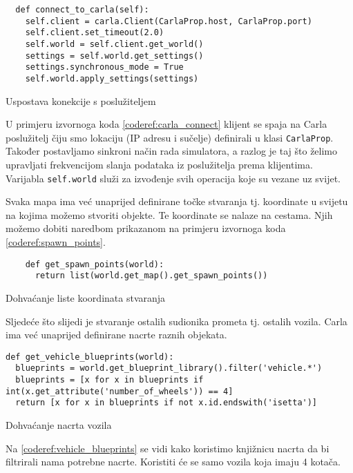 \begin{listing}[h!]
  \begin{verbatim}
  def connect_to_carla(self):
    self.client = carla.Client(CarlaProp.host, CarlaProp.port)
    self.client.set_timeout(2.0)
    self.world = self.client.get_world()
    settings = self.world.get_settings()
    settings.synchronous_mode = True
    self.world.apply_settings(settings)
  \end{verbatim}
  \caption{Uspostava konekcije s poslužiteljem}
  \label{coderef:carla_connect}
\end{listing}

U primjeru izvornoga koda \ref{coderef:carla_connect} klijent se spaja na Carla poslužitelj čiju smo lokaciju (IP adresu i sučelje) definirali u klasi \texttt{CarlaProp}. Također postavljamo sinkroni način rada simulatora, a razlog je taj što želimo upravljati frekvencijom slanja podataka iz poslužitelja prema klijentima. Varijabla \texttt{self.world} služi za izvođenje svih operacija koje su vezane uz svijet.

Svaka mapa ima već unaprijed definirane točke stvaranja tj. koordinate u svijetu na kojima možemo stvoriti objekte. Te koordinate se nalaze na cestama. Njih možemo dobiti naredbom prikazanom na primjeru izvornoga koda \ref{coderef:spawn_points}. 

\begin{listing}[h!]
  \begin{verbatim}
    def get_spawn_points(world):
      return list(world.get_map().get_spawn_points())
  \end{verbatim}
  \caption{Dohvaćanje liste koordinata stvaranja}
  \label{coderef:spawn_points}
\end{listing}

Sljedeće što slijedi je stvaranje ostalih sudionika prometa tj. ostalih vozila. Carla ima već unaprijed definirane nacrte raznih objekata.

\begin{listing}[h!]
  \begin{verbatim}
def get_vehicle_blueprints(world):
  blueprints = world.get_blueprint_library().filter('vehicle.*')
  blueprints = [x for x in blueprints if int(x.get_attribute('number_of_wheels')) == 4]
  return [x for x in blueprints if not x.id.endswith('isetta')]
  \end{verbatim}
  \caption{Dohvaćanje nacrta vozila}
  \label{coderef:vehicle_blueprints}
\end{listing}
\pagebreak
Na \ref{coderef:vehicle_blueprints} se vidi kako koristimo knjižnicu nacrta da bi filtrirali nama potrebne nacrte. Koristiti će se samo vozila koja imaju 4 kotača.

